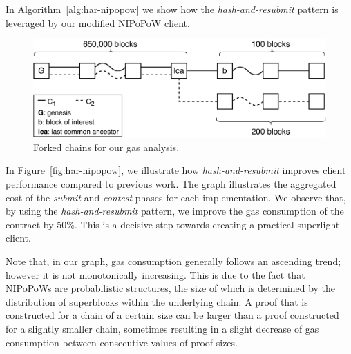 In Algorithm~\ref{alg:har-nipopow} we show how the \emph{hash-and-resubmit} pattern
is leveraged by our modified NIPoPoW client.

\begin{figure}[!h]
    \begin{center}
        \includegraphics[width=1\columnwidth]{figures/nipopow-subm-cont}
    \end{center}
    \caption{Forked chains for our gas analysis.}
    \label{fig:chains}
\vspace*{-3mm}
\end{figure}

In Figure~\ref{fig:har-nipopow}, we illustrate how \emph{hash-and-resubmit}
improves client performance compared to previous work. The graph
illustrates the aggregated cost of the \emph{submit} and \emph{contest} phases for
each implementation. We observe that, by using the \emph{hash-and-resubmit}
pattern, we improve the gas consumption of the contract by 50\%. This
is a decisive step towards creating a practical superlight client.

Note that, in our graph, gas consumption generally follows an ascending trend; however it
is not monotonically increasing. This is due to the fact that
NIPoPoWs are probabilistic structures, the size of which is determined by the
distribution of superblocks within the underlying chain. A proof that is
constructed for a chain of a certain size can be larger than a proof
constructed for a slightly smaller chain, sometimes resulting in a slight decrease
of gas consumption between consecutive values of proof sizes.



